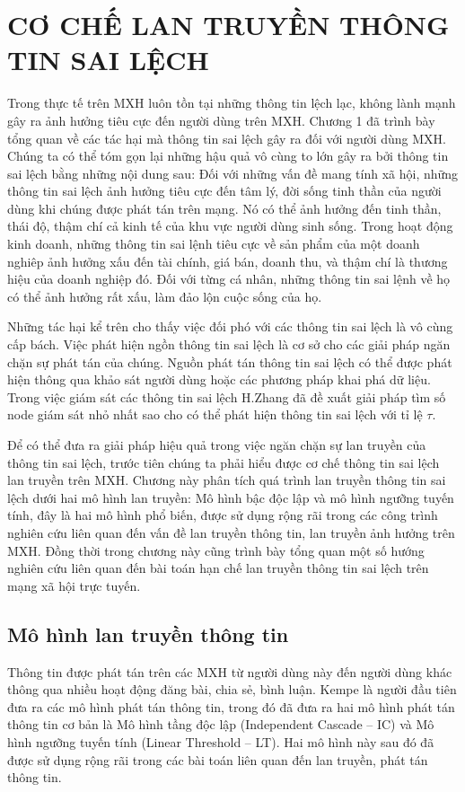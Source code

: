 \chapter{CƠ CHẾ LAN TRUYỀN THÔNG TIN SAI LỆCH}
Trong thực tế trên MXH luôn tồn tại những thông tin lệch lạc, không lành mạnh gây ra ảnh hưởng tiêu cực đến người dùng trên MXH. Chương 1 đã trình bày tổng quan về các tác hại mà thông tin sai lệch gây ra đối với người dùng MXH. Chúng ta có thể tóm gọn lại những hậu quả vô cùng to lớn gây ra bởi thông tin sai lệch bằng những nội dung sau: Đối với những vấn đề mang tính xã hội, những thông tin sai lệch ảnh hưởng tiêu cực đến tâm lý, đời sống tinh thần của người dùng khi chúng được phát tán trên mạng. Nó có thể ảnh hưởng đến tinh thần, thái độ, thậm chí cả kinh tế của khu vực người dùng sinh sống. Trong hoạt động kinh doanh, những thông tin sai lệnh tiêu cực về sản phẩm của một doanh nghiêp ảnh hưởng xấu đến tài chính, giá bán, doanh thu, và thậm chí là thương hiệu của doanh nghiệp đó. Đối với từng cá nhân, những thông tin sai lệnh về họ có thể ảnh hưởng rất xấu, làm đảo lộn cuộc sống của họ. 

Những tác hại kể trên cho thấy việc đối phó với các thông tin sai lệch là vô cùng cấp bách. Việc phát hiện ngồn thông tin sai lệch là cơ sở cho các giải pháp ngăn chặn sự phát tán của chúng. Nguồn phát tán thông tin sai lệch có thể được phát hiện thông qua khảo sát người dùng hoặc các phương pháp khai phá dữ liệu. Trong việc giám sát các thông tin sai lệch H.Zhang \cite{zhang1} đã đề xuất giải pháp tìm số node giám sát nhỏ nhất sao cho có thể phát hiện thông tin sai lệch với tỉ lệ $\tau$. 

Để có thể đưa ra giải pháp hiệu quả trong việc ngăn chặn sự lan truyền của thông tin sai lệch, trước tiên chúng ta phải hiểu được cơ chế thông tin sai lệch lan truyền trên MXH. Chương này phân tích quá trình lan truyền thông tin sai lệch dưới hai mô hình lan truyền: Mô hình bậc độc lập và mô hình ngưỡng tuyến tính, đây là hai mô hình phổ biến, được sử dụng rộng rãi trong các công trình nghiên cứu liên quan đến vấn đề lan truyền thông tin, lan truyền ảnh hưởng trên MXH. Đồng thời trong chương này cũng trình bày tổng quan một số hướng nghiên cứu liên quan đến bài toán hạn chế lan truyền thông tin sai lệch trên mạng xã hội trực tuyến.


\section{Mô hình lan truyền thông tin}
Thông tin được phát tán trên các MXH từ người dùng này đến người dùng khác thông qua nhiều hoạt động đăng bài, chia sẻ, bình luận. Kempe \cite{kemple1} là người đầu tiên đưa ra các mô hình phát tán thông tin, trong đó đã đưa ra hai mô hình phát tán thông tin cơ bản là Mô hình tầng độc lập (Independent Cascade – IC) và Mô hình ngưỡng tuyến tính (Linear Threshold – LT). Hai mô hình này sau đó đã được sử dụng rộng rãi trong các bài toán liên quan đến lan truyền, phát tán thông tin.

